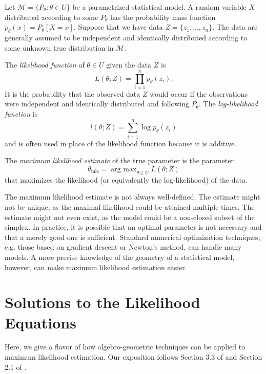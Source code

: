 \documentclass[cclicense]{hmcthesis}
\newcommand*{\Mod}{\mathcal{M}}
\newcommand*{\mle}{\theta_{\text{mle}}}
\DeclareMathOperator*{\argmax}{arg\ max}
\numberwithin{equation}{section}
\begin{document}
    Let $\Mod = \{P_\theta : \theta \in U\}$ be a parametrized statistical
    model. A random variable $X$ distributed according to some $P_\theta$ has
    the probability mass function $p_\theta(x) = P_\theta[X = x]$.  Suppose that
    we have data $Z = \{z_1, \ldots, z_n\}$.  The data are generally assumed to
    be independent and identically distributed according to some unknown true
    distribution in $\Mod$.
    
    \begin{definition}
    The \emph{likelihood function} of $\theta \in U$ given the data $Z$ is
    \[
        L(\theta; Z) = \prod_{i=1}^n p_\theta(z_i).
    \]
    It is the probability that the observed data $Z$ would occur if the
    observations were independent and identically distributed and following
    $P_\theta$.  The \emph{log-likelihood function} is
    \[
        l(\theta; Z) = \sum_{i=1}^n \log p_\theta(z_i)
    \]
    and is often used in place of the likelihood function because it is additive.
    \end{definition}
    \begin{definition}
    The \emph{maximum likelihood estimate} of the true parameter is the
    parameter 
    \[
        \mle = \argmax_{\theta \in U} L(\theta; Z)
    \]
    that maximizes the likelihood (or equivalently the log-likelihood) of the
    data.
    \end{definition}

    The maximum likelihood estimate is not always well-defined.  The estimate
    might not be unique, as the maximal likelihood could be attained multiple
    times.  The estimate  might not even exist, as the model could be a
    non-closed subset of the simplex.  In practice, it is possible that an
    optimal parameter is not necessary and that a merely good one is sufficient.
    Standard numerical optimization techniques, e.g. those based on gradient
    descent or Newton's method, can handle many models.  A more precise
    knowledge of the geometry of a statistical model, however, can make maximum
    likelihood estimation easier.

\section{Solutions to the Likelihood Equations}

    Here, we give a flavor of how algebro-geometric techniques can be applied to
    maximum likelihood estimation.  Our exposition follows Section 3.3 of
    \citep{ASCB} and Section 2.1 of \citep{DSS08}.
\end{document}
